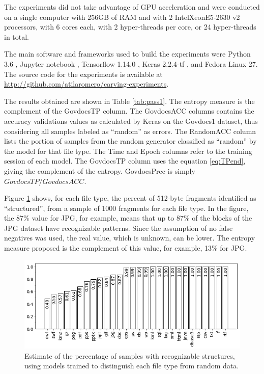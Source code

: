 The experiments did not take advantage of GPU acceleration and were  conducted on a single computer with 256GB of RAM and with 2 Intel\textregistered Xeon\textregistered E5-2630 v2 processors, with 6 cores each, with 2 hyper-threads per core, or 24 hyper-threads in total. 


The main software and frameworks used to build the experiments were Python 3.6 
\cite{rossum_python_2019}, Jupyter notebook \cite{perez_jupyter_2019}, Tensorflow 1.14.0 \cite{google_brain_tensorflow_2019}, Keras 2.2.4-tf \cite{chollet_keras_2019}, and Fedora Linux 27.
The source code for the experiments is available at \sloppy\url{http://github.com/atilaromero/carving-experiments}.




The results obtained are shown in Table \ref{tab:pass1}. The entropy measure is the complement of the GovdocsTP column.  The GovdocsACC columns contains the accuracy validations values as calculated by Keras on the Govdocs1 dataset, thus considering all samples labeled as ``random'' as errors. The RandomACC column lists the portion of samples from the random generator classified as ``random'' by the model for that file type. The Time and Epoch columns refer to the training session of each model. The GovdocsTP column uses the equation \ref{eq:TPend}, giving the complement of the entropy. GovdocsPrec is simply $GovdocsTP/GovdocsACC$.

Figure \ref{fig:not_random} shows, for each file type, the percent of 512-byte fragments identified as ``structured'', from a sample of 1000 fragments for each file type.
In the figure, the 87\% value for JPG, for example, means that up to 87\% of the blocks of the JPG dataset have recognizable patterns. Since the assumption of no false negatives was used, the real value, which is unknown, can be lower. The entropy measure proposed is the complement of this value, for example, 13\% for JPG.

\noindent
\begin{figure}[htb!]
\centering\includegraphics[width=1.0\textwidth]{content/random.png}
\caption[Complement of entropy measure for 28 file types]{\label{fig:not_random}Estimate of the percentage of samples with recognizable structures, using models trained to distinguish each file type from random data. }%
\end{figure}
